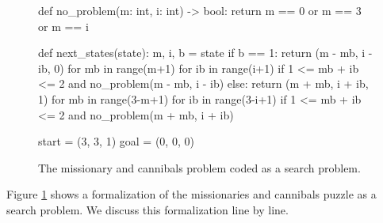 \begin{figure}[!ht]
\centering
\begin{python3code}
    def no_problem(m: int, i: int) -> bool: 
        return m == 0 or m == 3 or m == i

    def next_states(state):
        m, i, b = state
        if b == 1:
            return { (m - mb, i - ib, 0) for mb in range(m+1)
                                         for ib in range(i+1)
                                         if 1 <= mb + ib <= 2 and 
                                            no_problem(m - mb, i - ib) 
                   }
        else:
            return { (m + mb, i + ib, 1) for mb in range(3-m+1)
                                         for ib in range(3-i+1)
                                         if 1 <= mb + ib <= 2 and 
                                            no_problem(m + mb, i + ib) 
                   }

    start = (3, 3, 1)
    goal  = (0, 0, 0)
\end{python3code}
\vspace*{-0.3cm}
\caption{The missionary and cannibals problem coded as a search problem.}
\label{fig:missionaries.stlx}
\end{figure}
\noindent
Figure \ref{fig:missionaries.stlx} shows a formalization of the missionaries and cannibals puzzle
as a search problem.  We discuss this formalization line by line.
